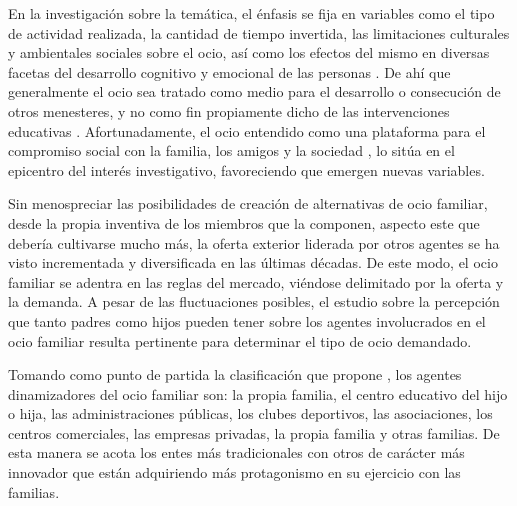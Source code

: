 \documentclass{textolivre}
\begin{document}
En la investigación sobre la temática, el énfasis se fija en variables como el tipo de actividad realizada, la cantidad de tiempo invertida, las limitaciones culturales y ambientales sociales sobre el ocio, así como los efectos del mismo en diversas facetas del desarrollo cognitivo y emocional de las personas \cite{newman2014}. De ahí que generalmente el ocio sea tratado como medio para el desarrollo o consecución de otros menesteres, y no como fin propiamente dicho de las intervenciones educativas \cite{chen2018}. Afortunadamente, el ocio entendido como una plataforma para el compromiso social con la familia, los amigos y la sociedad \cite{kelly2012}, lo sitúa en el epicentro del interés investigativo, favoreciendo que emergen nuevas variables. 

Sin menospreciar las posibilidades de creación de alternativas de ocio familiar, desde la propia inventiva de los miembros que la componen, aspecto este que debería cultivarse mucho más, la oferta exterior liderada por otros agentes se ha visto incrementada y diversificada en las últimas décadas. De este modo, el ocio familiar se adentra en las reglas del mercado, viéndose delimitado por la oferta y la demanda. A pesar de las fluctuaciones posibles, el estudio sobre la percepción que tanto padres como hijos pueden tener sobre los agentes involucrados en el ocio familiar resulta pertinente para determinar el tipo de ocio demandado. 

Tomando como punto de partida la clasificación que propone \textcite{alvarez2020}, los agentes dinamizadores del ocio familiar son: la propia familia, el centro educativo del hijo o hija, las administraciones públicas, los clubes deportivos, las asociaciones, los centros comerciales, las empresas privadas, la propia familia y otras familias. De esta manera se acota los entes más tradicionales con otros de carácter más innovador que están adquiriendo más protagonismo en su ejercicio con las familias. 
\end{document}
